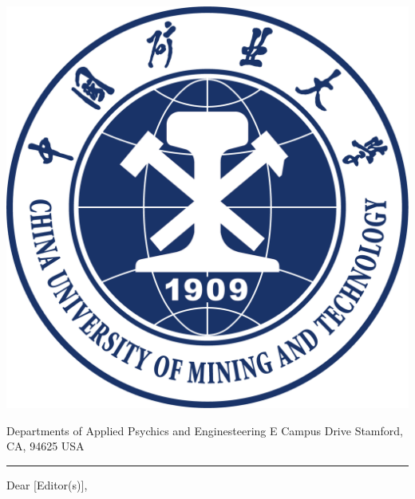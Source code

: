 \documentclass[11pt]{article}
\newcommand{\mybullet}{\textbullet\hspace{0.5em}}
\begin{document}
\noindent
\begin{minipage}[t]{0.15\textwidth}
\vspace*{-2.8cm} %
\includegraphics[width=\linewidth]{CUMT.png} %
\end{minipage}
\hfill
\begin{minipage}[t]{0.6\textwidth}
\vspace*{-2.2cm} %
{\color{black} Departments of Applied Psychics and Enginesteering\color{mygray}\small{} E Campus Drive \mybullet Stamford, CA, 94625 \mybullet USA}
\end{minipage}

\vspace{-0cm} %

\noindent\rule{\linewidth}{1.2pt} %
\bigskip
\noindent Dear [Editor(s)],
\end{document}
